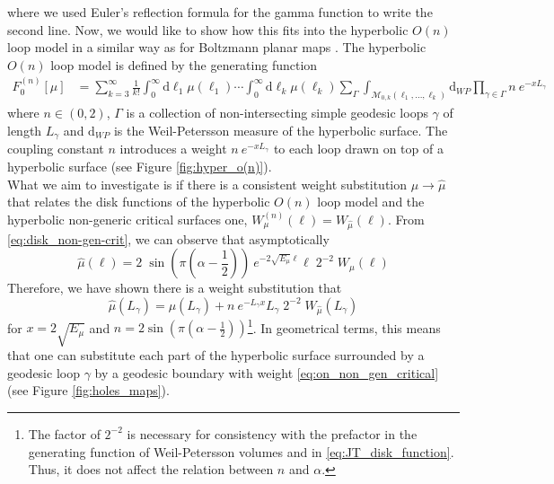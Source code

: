 \documentclass[a4paper,11pt]{article}
\newcommand{\rmd}{\mathrm{d}}
\begin{document}
where we used Euler's reflection formula for the gamma function to write the second line.
Now, we would like to show how this fits into the hyperbolic $O(n)$ loop model in a similar way as for Boltzmann planar maps \cite{Borot:2011kg}. The hyperbolic $O(n)$ loop model is defined by the generating function 
\begin{align}
    F^{(n)}_0[\mu] &= \sum_{k=3}^\infty\frac{1}{k!} \int_{0}^\infty \rmd \ell_1 \mu(\ell_1) \cdots \int_{0}^\infty \rmd \ell_k \mu(\ell_k)
	\sum_\Gamma \int_{\mathcal{M}_{0,k}(\ell_1,...,\ell_k)}\rmd_{WP} \prod_{\gamma\in \Gamma} n \ e^{-x L_\gamma}
\end{align}
where $n\in(0,2)$, $\Gamma$ is a collection of non-intersecting simple geodesic loops $\gamma$ of length $L_\gamma$ and $\rmd_{WP}$ is the Weil-Petersson measure of the hyperbolic surface. The coupling constant $n$ introduces a weight $n\ e^{-x L_\gamma}$ to each loop drawn on top of a hyperbolic surface (see Figure \ref{fig:hyper_o(n)}).\\  
What we aim to investigate is if there is a consistent weight substitution $\mu \rightarrow\hat{\mu}$ that relates the disk functions of the hyperbolic $O(n)$ loop model and the hyperbolic non-generic critical surfaces one, $W_\mu^{(n)}(\ell)=W_{\hat{\mu}}(\ell)$. From \eqref{eq:disk_non-gen-crit}, we can observe that asymptotically
\begin{equation}
    \hat{\mu}(\ell)= 2\;\sin\left(\pi\left(\alpha-\frac{1}{2}\right)\right)  \ e^{-2\sqrt{E_\mu}\ell} \ell\; 2^{-2}\; W_{\hat{\mu}}(\ell)  \label{weigth_substitution_hypo(n)}
\end{equation}
Therefore, we have shown there is a weight substitution that  
\begin{equation}
    \hat{\mu}(L_\gamma) = \mu(L_\gamma) + n  \ e^{-L_\gamma x} L_\gamma \; 2^{-2}\;W_{\hat{\mu}}(L_\gamma)\label{eq:on_non_gen_critical}
\end{equation}
for $x=2\sqrt{E_\mu}$ and $n=2\sin\left(\pi\left(\alpha-\frac{1}{2}\right)\right)$\footnote{The factor of $2^{-2}$ is necessary for consistency with the prefactor in the generating function of Weil-Petersson volumes and in \eqref{eq:JT_disk_function}. Thus, it does not affect the relation between $n$ and $\alpha$.}. In geometrical terms, this means that one can substitute each part of the hyperbolic surface surrounded by a geodesic loop $\gamma$ by a geodesic boundary with weight \eqref{eq:on_non_gen_critical} (see Figure \ref{fig:holes_maps}).\\
\end{document}
